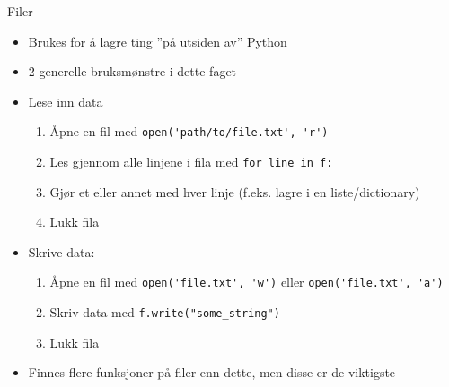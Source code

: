 \documentclass[screen, aspectratio=169]{beamer}
\begin{document}
\begin{frame}[fragile]{Filer}
	\begin{itemize}
		\item Brukes for å lagre ting ''på utsiden av'' Python
		\item 2 generelle bruksmønstre i dette faget
		\item Lese inn data
		\begin{enumerate}
			\item Åpne en fil med \lstinline|open('path/to/file.txt', 'r')|
			\item Les gjennom alle linjene i fila med \lstinline|for line in f:|
			\item Gjør et eller annet med hver linje (f.eks. lagre i en liste/dictionary)
			\item Lukk fila
		\end{enumerate}
	\item Skrive data:
		\begin{enumerate}
			\item Åpne en fil med \lstinline|open('file.txt', 'w')| eller \lstinline|open('file.txt', 'a')|
			\item Skriv data med \lstinline|f.write("some_string")|
			\item Lukk fila
		\end{enumerate}
		\item Finnes flere funksjoner på filer enn dette, men disse er de viktigste
	\end{itemize}
\end{frame}
\end{document}

